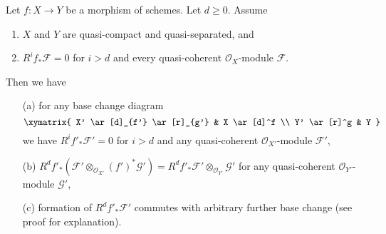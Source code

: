 \begin{lemma}
\label{lemma-top-cohomology-functor}
Let $f : X \to Y$ be a morphism of schemes. Let $d \geq 0$. Assume
\begin{enumerate}
\item $X$ and $Y$ are quasi-compact and quasi-separated, and
\item $R^if_*\mathcal{F} = 0$ for $i > d$ and
every quasi-coherent $\mathcal{O}_X$-module $\mathcal{F}$.
\end{enumerate}
Then we have
\begin{enumerate}
\item[(a)] for any base change diagram
$$
\xymatrix{
X' \ar[d]_{f'} \ar[r]_{g'} & X \ar[d]^f \\
Y' \ar[r]^g & Y
}
$$
we have $R^if'_*\mathcal{F}' = 0$ for $i > d$ and any quasi-coherent
$\mathcal{O}_{X'}$-module $\mathcal{F}'$,
\item[(b)]
$R^df'_*(\mathcal{F}' \otimes_{\mathcal{O}_{X'}} (f')^*\mathcal{G}') =
R^df'_*\mathcal{F}' \otimes_{\mathcal{O}_{Y'}} \mathcal{G}'$
for any quasi-coherent $\mathcal{O}_{Y'}$-module $\mathcal{G}'$,
\item[(c)] formation of $R^df'_*\mathcal{F}'$ commutes with arbitrary
further base change (see proof for explanation).
\end{enumerate}
\end{lemma}

